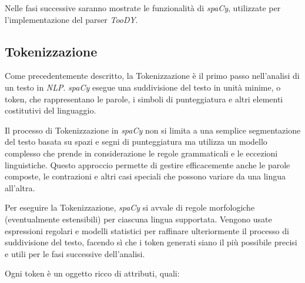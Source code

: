 \documentclass[12pt]{report}
\newcommand{\toody}{\textsl{TooDY}\xspace}
\newcommand{\spacy}{\textsl{spaCy}\xspace}
\newcommand{\nlp}{\textsl{NLP}\xspace}
\begin{document}
Nelle fasi successive saranno mostrate le funzionalità di \spacy, utilizzate per l'implementazione del parser \toody.


\subsection{Tokenizzazione}
\label{sec:tokenizzazione}
Come precedentemente descritto, la \textsf{Tokenizzazione} è il primo passo nell'analisi di un testo in \nlp. \spacy esegue una suddivisione del testo in unità minime, o token, che rappresentano le parole, i simboli di punteggiatura e altri elementi costitutivi del linguaggio.

Il processo di Tokenizzazione in \spacy non si limita a una semplice segmentazione del testo basata su spazi e segni di punteggiatura ma utilizza un modello complesso che prende in considerazione le regole grammaticali e le eccezioni linguistiche. Questo approccio permette di gestire efficacemente anche le parole composte, le contrazioni e altri casi speciali che possono variare da una lingua all'altra.

Per eseguire la Tokenizzazione, \spacy si avvale di regole morfologiche (eventualmente estensibili) per ciascuna lingua supportata. Vengono usate espressioni regolari e modelli statistici per raffinare ulteriormente il processo di suddivisione del testo, facendo sì che i token generati siano il più possibile precisi e utili per le fasi successive dell'analisi.

Ogni token è un oggetto ricco di attributi, quali:
\end{document}
